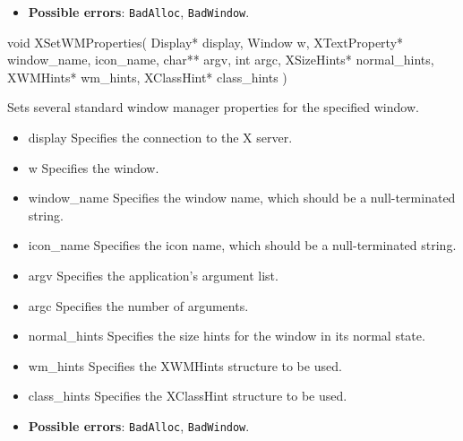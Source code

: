 \documentclass{report}
\begin{document}
\begin{itemize}
            \begin{itemize}
                \item \textbf{Possible errors}: \texttt{BadAlloc}, \texttt{BadWindow}.
            \end{itemize}

            \begin{cppcode}
            void XSetWMProperties(
                Display* display,
                Window w,
                XTextProperty* window_name, icon_name,
                char** argv,
                int argc,
                XSizeHints* normal_hints,
                XWMHints* wm_hints,
                XClassHint* class_hints
            )
            \end{cppcode}
            \bigbreak \noindent
            Sets several standard window manager properties for the specified window.

            \begin{itemize}
                \item display Specifies the connection to the X server.
                \item w Specifies the window.
                \item window\_name Specifies the window name, which should be a null-terminated string.
                \item icon\_name Specifies the icon name, which should be a null-terminated string.
                \item argv Specifies the application’s argument list.
                \item argc Specifies the number of arguments.
                \item normal\_hints Specifies the size hints for the window in its normal state.
                \item wm\_hints Specifies the XWMHints structure to be used.
                \item class\_hints Specifies the XClassHint structure to be used.
            \end{itemize}

            \begin{itemize}
                \item \textbf{Possible errors}: \texttt{BadAlloc}, \texttt{BadWindow}.
            \end{itemize}


    \end{itemize}
\end{document}
